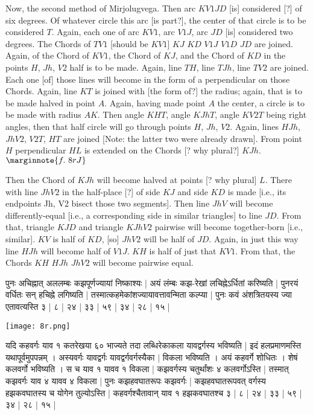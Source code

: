 \documentclass[12pt]{book}
\begin{document}
\newpage

Now, the second method of Mirjolugvega. Then arc $KV1JD$ [is] considered [?] of six degrees.
Of whatever circle this arc [is part?], the center of that circle is to be considered $T$. Again, 
each one of arc $KV1$, arc $V1J$, arc $JD$ [is] considered two degrees. The Chords
of $TV1$ [should be $KV1$] $KJ$ $KD$ $V1J$ $V1D$ $JD$ are joined. Again, of the Chord of $KV1$,
the Chord of $KJ$, and the Chord of $KD$ in the points $H$, $Jh$, $V2$ half  is to be made.
Again, line $TH$, line $TJh$, line $TV2$ are  joined. Each one [of] those lines 
will become in the form of a perpendicular on those Chords. 
Again, line $KT$ is joined with [the form of?] the radius; again, that is to be made halved
in point $A$. Again, having made point $A$ the center, a circle is to be made with
radius $AK$. Then angle $KHT$, angle $KJhT$, angle $KV2T$ being right angles, 
then  that half circle will go through points $H$, $Jh$, $V2$. 
Again, lines $HJh$, $JhV2$, $V2T$, $HT$ are joined [Note: the latter two were already
drawn]. From 
point $H$ perpendicular $HL$ is extended on the Chords [? why plural?] $KJh$. 
$\marginnote{f.~8r J}$

Then the Chord of $KJh$ will become halved at points [? why plural] $L$. There with line $JhV2$ 
in the half-place [?] of side $KJ$ and side $KD$ is made [i.e., its endpoints Jh, V2 bisect those 
two segments]. Then line $JhV$ will
become differently-equal [i.e., a corresponding side in similar triangles]
to line $JD$. From that, triangle $KJD$ and triangle
$KJhV2$ pairwise will become together-born [i.e., similar]. 
$KV$ is half of $KD$, [so] $JhV2$ will be half of $JD$.
Again, in just this way line $HJh$ will become half of $V1 J$. $KH$ is half of just that $KV1$.
From that, the Chords $KH$ $HJh$ $JhV2$ will become pairwise equal. 

\newpage

{\s पुनः अचिह्नात् अललम्बः कझपूर्णज्यायां निष्काश्यः | अयं लंम्बः कझ-रेखां लचिह्नेऽर्धितां करिष्यति |
पुनरयं वर्धितः सन् हचिह्ने लगिष्यति | तस्मात्कहमेकांशज्यायावत्तावन्मिता कल्प्या | पुनः कवं अंशत्रितयस्य ज्या एतावत्यस्ति ३ | ८ | २४ | ३३ | ५९ | ३४ | २८ | १५ |} \\

\begin{center}
\texttt{[image: 8r.png]}
\end{center}

{\s यदि कहवर्गः याव १ कतरेखया ६० भाज्यते तदा लब्धिरेकाकला यावद्वर्गस्य भविष्यति | इदं हलप्रमाणमस्ति यथापूर्वमुपपन्नम् । अस्यवर्गः यावद्वर्गः यावद्वर्गवर्गस्यैका $|$
विकला भविष्यति । अयं कहवर्गे शोधितः । शेषं कलवर्गो भविष्यति । स च याव १ यावव $\dot{१}$ विकला | कझवर्गस्य चतुर्थांशः ४ 
कलवर्गोऽस्ति | तस्मात् कझवर्गः याव $\dot{४}$ यावव ४ विकला | पुनः कझहवघातरूपः
कझवर्गः | कझहवघातरूपवत् वर्गस्य हझकवघातस्य च योगेन तुल्योऽस्ति |
कहवर्गश्चैतावान् याव १ हझकवघातश्च ३ | ८ | २४ | ३३ | ५९ | ३४ | २८ | १५ |}
\end{document}
